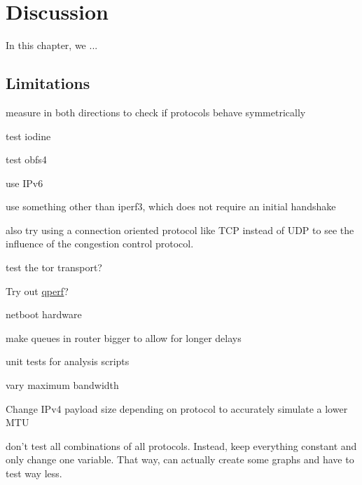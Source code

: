 
\chapter{Discussion}
\label{chap:discussion}
In this chapter, we ...

\section{Limitations}

measure in both directions to check if protocols behave symmetrically

test iodine

test obfs4

use IPv6

use something other than iperf3, which does not require an initial handshake

also try using a connection oriented protocol like TCP instead of UDP to see the influence of the congestion control protocol.

test the tor transport? 

Try out \href{https://github.com/rbruenig/qperf}{qperf}?

netboot hardware

make queues in router bigger to allow for longer delays

unit tests for analysis scripts

vary maximum bandwidth

Change IPv4 payload size depending on protocol to accurately simulate a lower MTU

don't test all combinations of all protocols.
Instead, keep everything constant and only change one variable.
That way, can actually create some graphs and have to test way less.


